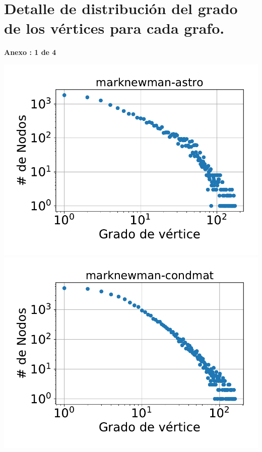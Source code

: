 \chapter{Detalle de distribución del grado de los vértices para cada grafo.}
\label{anexo:grades}

\centering
\textbf{Anexo \thechapter:  1 de 4}
\begin{minipage}{1\textwidth}
    \centering
    \includegraphics[width=.9\linewidth]{img/grades/marknewman-astro.pdf} \\
    \includegraphics[width=.9\linewidth]{img/grades/marknewman-condmat.pdf} \\
\end{minipage}

